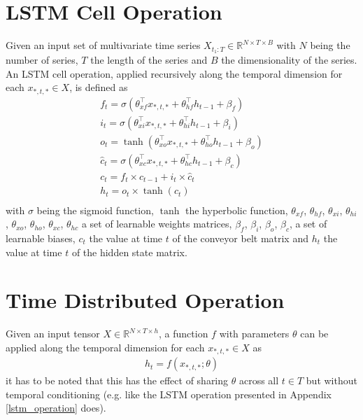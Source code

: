 \section{LSTM Cell Operation}
Given an input set of multivariate time series $X_{t_1:T} \in \mathbb{R}^{N \times T \times B}$ with $N$ being the number of series, $T$ the length of the series and $B$ the dimensionality of the series. An LSTM cell operation, applied recursively along the temporal dimension for each $x_{*,t,*} \in X$, is defined as
\begin{gather}
    \label{lstm_operation}
    f_t = \sigma(\theta_{xf}^\top x_{*,t,*} + \theta_{hf}^\top h_{t-1} + \beta_f) \\ \nonumber
    i_t = \sigma(\theta_{xi}^\top x_{*,t,*} + \theta_{hi}^\top h_{t-1} + \beta_i) \\ \nonumber
    o_t = \tanh(\theta_{xo}^\top x_{*,t,*} + \theta_{ho}^\top h_{t-1} + \beta_o) \\ \nonumber
    \widehat{c}_t = \sigma(\theta_{xc}^\top x_{*,t,*} + \theta_{hc}^\top h_{t-1} + \beta_c) \\ \nonumber
    c_t = f_t \times c_{t-1} + i_t \times \widehat{c}_t \\ \nonumber
    h_t = o_t \times \tanh(c_t) \\ \nonumber
\end{gather}
with $\sigma$  being the sigmoid function, $\tanh$ the hyperbolic function, $\theta_{xf}$, $\theta_{hf}$, $\theta_{xi}$, $\theta_{hi}$, $\theta_{xo}$, $\theta_{ho}$, $\theta_{xc}$, $\theta_{hc}$ a set of learnable weights matrices, $\beta_f$, $\beta_i$, $\beta_o$, $\beta_c$, a set of learnable biases, $c_t$ the value at time $t$ of the conveyor belt matrix and $h_t$ the value at time $t$ of the hidden state matrix.


\section{Time Distributed Operation}
Given an input tensor $X \in \mathbb{R}^{N \times T \times h}$, a function $f$ with parameters $\theta$ can be applied along the temporal dimension for each $x_{*,t,*} \in X$ as
\begin{gather}
    \label{time_distributed}
    h_t = f(x_{*,t,*}; \theta)
\end{gather}
it has to be noted that this has the effect of sharing $\theta$ across all $t \in T$ but without temporal conditioning (e.g. like the LSTM operation presented in Appendix \ref{lstm_operation} does).

